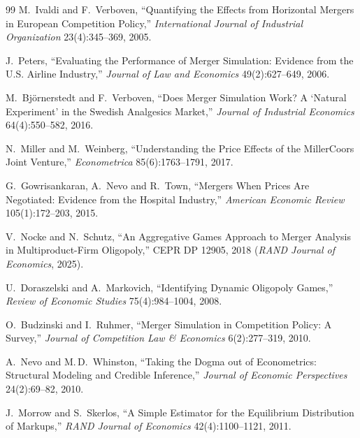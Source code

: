 \documentclass[11pt,a4paper]{article}
\begin{document}
\begin{thebibliography}{99}
M.~Ivaldi and F.~Verboven, ``Quantifying the Effects from Horizontal Mergers in European
Competition Policy,'' \emph{International Journal of Industrial Organization}
23(4):345--369, 2005.

J.~Peters, ``Evaluating the Performance of Merger Simulation: Evidence from the U.S.
Airline Industry,'' \emph{Journal of Law and Economics} 49(2):627--649, 2006.

M.~Bj\"ornerstedt and F.~Verboven, ``Does Merger Simulation Work? A `Natural Experiment'
in the Swedish Analgesics Market,'' \emph{Journal of Industrial Economics}
64(4):550--582, 2016.

N.~Miller and M.~Weinberg, ``Understanding the Price Effects of the MillerCoors Joint
Venture,'' \emph{Econometrica} 85(6):1763--1791, 2017.

G.~Gowrisankaran, A.~Nevo and R.~Town, ``Mergers When Prices Are Negotiated: Evidence
from the Hospital Industry,'' \emph{American Economic Review} 105(1):172--203, 2015.

V.~Nocke and N.~Schutz, ``An Aggregative Games Approach to Merger Analysis in
Multiproduct-Firm Oligopoly,'' CEPR DP 12905, 2018 (\emph{RAND Journal of Economics},
2025).

U.~Doraszelski and A.~Markovich, ``Identifying Dynamic Oligopoly Games,''
\emph{Review of Economic Studies} 75(4):984--1004, 2008.

O.~Budzinski and I.~Ruhmer, ``Merger Simulation in Competition Policy: A Survey,''
\emph{Journal of Competition Law \& Economics} 6(2):277--319, 2010.

A.~Nevo and M.\,D.~Whinston, ``Taking the Dogma out of Econometrics: Structural Modeling
and Credible Inference,'' \emph{Journal of Economic Perspectives} 24(2):69--82, 2010.

J.~Morrow and S.~Skerlos, ``A Simple Estimator for the Equilibrium Distribution of
Markups,'' \emph{RAND Journal of Economics} 42(4):1100--1121, 2011.

\end{thebibliography}
\end{document}

